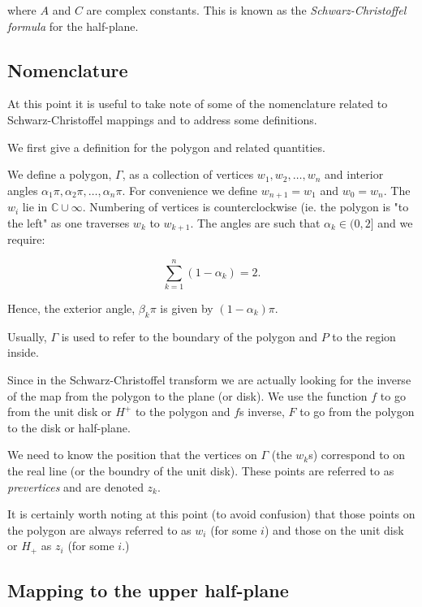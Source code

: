 \documentclass[a4paper,10pt]{amsart}
\newcommand{\sch}{Schwarz-Christoffel }
\begin{document}
where $A$ and $C$ are complex constants. This is known as the \emph{\sch formula} for the half-plane.


\subsection{Nomenclature}

At this point it is useful to take note of some of the nomenclature related to \sch mappings and to address some definitions.

We first give a definition for the polygon and related quantities.

\begin{defn}[Polygon]
We define a polygon, $\Gamma$, as a collection of vertices $w_1, w_2,\dots,w_n$ and interior angles $\alpha_1\pi, \alpha_2\pi, \dots, \alpha_n\pi$. For convenience we define $w_{n+1} = w_1$ and $w_0=w_n$. The $w_i$ lie in $\mathbb{C} \cup {\infty}$. Numbering of vertices is counterclockwise (ie. the polygon is "to the left" as one traverses $w_k$ to $w_{k+1}$. The angles are such that $\alpha_k \in (0,2]$ and we require:

\begin{equation}
\sum_{k=1}^n (1-\alpha_k) = 2.
\end{equation}

Hence, the exterior angle, $\beta_k\pi$ is given by $(1-\alpha_k)\pi$.

Usually, $\Gamma$ is used to refer to the boundary of the polygon and $P$ to the region inside.

\end{defn}

Since in the \sch transform we are actually looking for the inverse of the map from the polygon to the plane (or disk). We use the function $f$ to go from the unit disk or $H^+$ to the polygon and $f$s inverse, $F$ to go from the polygon to the disk or half-plane.  

We need to know the position that the vertices on $\Gamma$ (the $w_k$s) correspond to on the real line (or the boundry of the unit disk). These points are referred to as \emph{prevertices} and are denoted $z_k$.

It is certainly worth noting at this point (to avoid confusion) that those points on the polygon are always referred to as $w_i$ (for some $i$) and those on the unit disk or $H_+$ as $z_i$ (for some $i$.)




\subsection{Mapping to the upper half-plane}
\end{document}
